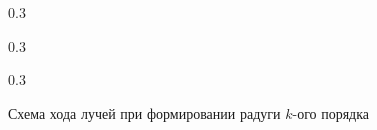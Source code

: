 \begin{figure}[t]
    \begin{subcaptionblock}{0.3\tw}
        \centering
        \caption{$k=1$}
        \label{pic:rainbow-1}
    \end{subcaptionblock}
    \hfill
    \begin{subcaptionblock}{0.3\tw}
        \centering
        \caption{$k=2$}
        \label{pic:rainbow-2}
    \end{subcaptionblock}
    \hfill
    \begin{subcaptionblock}{0.3\tw}   
        \centering
        \caption{$k=3$}
        \label{pic:rainbow-3}
    \end{subcaptionblock}
    \caption{Схема хода лучей при формировании радуги $k$-ого порядка}
    \label{pic:rainbow}
\end{figure}
